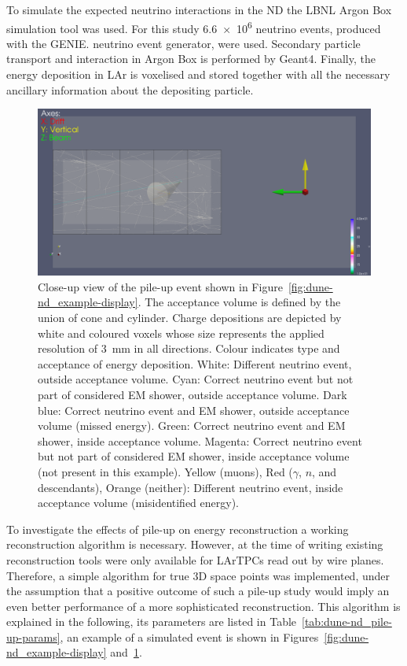 \documentclass[a4paper]{article}
\begin{document}
To simulate the expected neutrino interactions in the ND the LBNL Argon Box simulation tool was used.
For this study \num{6.6e6} neutrino events, produced with the GENIE. neutrino event generator, were used.
Secondary particle transport and interaction in Argon Box is performed by Geant4.
Finally, the energy deposition in LAr is voxelised and stored together with all the necessary ancillary information about the depositing particle.

\begin{figure}[tbp]
	\centering
	\includegraphics[viewport=2900 1800 4000 2600, clip, width=\textwidth]{Figures/uid0_spill6_event461_gamma19_x}
	\caption[Pile-up study example event close-up]{%
		Close-up view of the pile-up event shown in Figure~\ref{fig:dune-nd_example-display}.
		The acceptance volume is defined by the union of cone and cylinder.
		Charge depositions are depicted by white and coloured voxels whose size represents the applied resolution of \SI{3}{\milli\metre} in all directions.
		Colour indicates type and acceptance of energy deposition.
		White: Different neutrino event, outside acceptance volume.
		Cyan: Correct neutrino event but not part of considered EM shower, outside acceptance volume.
		Dark blue: Correct neutrino event and EM shower, outside acceptance volume (missed energy).
		Green: Correct neutrino event and EM shower, inside acceptance volume.
		Magenta: Correct neutrino event but not part of considered EM shower, inside acceptance volume (not present in this example).
		Yellow (muons), Red ($\gamma$, $n$, and descendants), Orange (neither): Different neutrino event, inside acceptance volume (misidentified energy).
	}
	\label{fig:dune-nd_example-display-zoom}
\end{figure}

To investigate the effects of pile-up on energy reconstruction a working reconstruction algorithm is necessary.
However, at the time of writing existing reconstruction tools were only available for LArTPCs read out by wire planes.
Therefore, a simple algorithm for true 3D space points was implemented, under the assumption that a positive outcome of such a pile-up study would imply an even better performance of a more sophisticated reconstruction.
This algorithm is explained in the following, its parameters are listed in Table~\ref{tab:dune-nd_pile-up-params}, an example of a simulated event is shown in Figures~\ref{fig:dune-nd_example-display} and~\ref{fig:dune-nd_example-display-zoom}.
\end{document}
